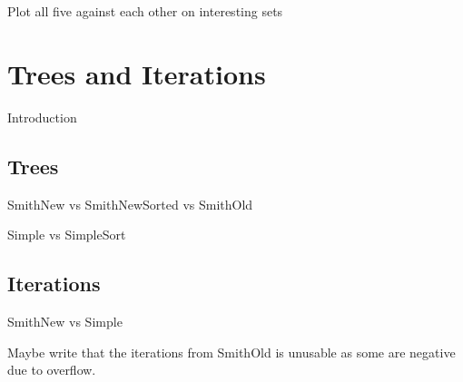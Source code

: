Plot all five against each other on interesting sets

\section{Trees and Iterations}
\label{sec:trees-iterations}

Introduction

\subsection{Trees}
\label{sec:trees}

SmithNew vs SmithNewSorted vs SmithOld

Simple vs SimpleSort

\subsection{Iterations}
\label{sec:iterations}

SmithNew vs Simple

Maybe write that the iterations from SmithOld is unusable as some are negative
due to overflow.

